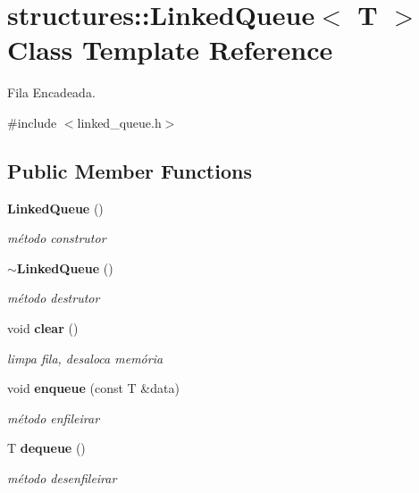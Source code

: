\section{structures\+::Linked\+Queue$<$ T $>$ Class Template Reference}
\label{classstructures_1_1_linked_queue}


Fila Encadeada.  




{\ttfamily \#include $<$linked\+\_\+queue.\+h$>$}

\subsection*{Public Member Functions}
\begin{DoxyCompactItemize}
\item 
\mbox{\label{classstructures_1_1_linked_queue_aae2a207f04610f5bb460de8b4f5c7650}} 
\textbf{ Linked\+Queue} ()
\begin{DoxyCompactList}\small\item\em método construtor \end{DoxyCompactList}\item 
\mbox{\label{classstructures_1_1_linked_queue_ad3f70a9465ecbf8868ad9206e2b01711}} 
\textbf{ $\sim$\+Linked\+Queue} ()
\begin{DoxyCompactList}\small\item\em método destrutor \end{DoxyCompactList}\item 
\mbox{\label{classstructures_1_1_linked_queue_a67dfb58a8feb96abccbd20862767e981}} 
void \textbf{ clear} ()
\begin{DoxyCompactList}\small\item\em limpa fila, desaloca memória \end{DoxyCompactList}\item 
\mbox{\label{classstructures_1_1_linked_queue_a6e9d6e444c5d534d01736bb82c34c815}} 
void \textbf{ enqueue} (const T \&data)
\begin{DoxyCompactList}\small\item\em método enfileirar \end{DoxyCompactList}\item 
\mbox{\label{classstructures_1_1_linked_queue_af6037408a07637554b8a8be7201a756d}} 
T \textbf{ dequeue} ()
\begin{DoxyCompactList}\small\item\em método desenfileirar \end{DoxyCompactList}\item 

\end{DoxyCompactItemize}
